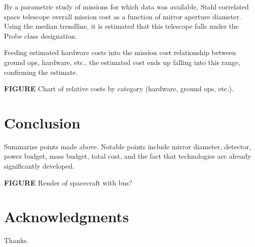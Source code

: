 \documentclass{ws-jai}
\begin{document}
By a parametric study of missions for which data was available, Stahl correlated space telescope overall mission cost as a function of mirror aperture diameter. Using the median trendline, it is estimated that this telescope falls under the Probe class designation.

Feeding estimated hardware costs into the mission cost relationship between ground ops, hardware, etc., the estimated cost ends up falling into this range, confirming the estimate.

\textbf{FIGURE} Chart of relative costs by category (hardware, ground ops, etc.).

\section{Conclusion}
\label{S:conclusion}
Summarize points made above. Notable points include mirror diameter, detector, power budget, mass budget, total cost, and the fact that technologies are already significantly developed.

\textbf{FIGURE} Render of spacecraft with bus?

\section*{Acknowledgments}
Thanks.


\end{document}
